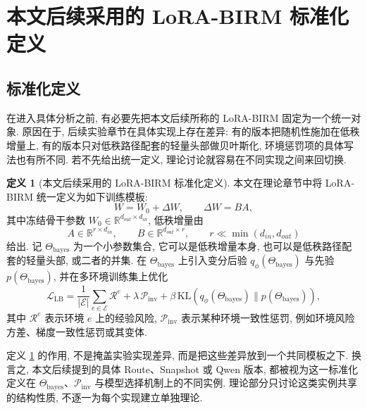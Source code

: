 \documentclass[a4paper,punct=banjiao,twoside]{ctexrep}
\theoremstyle{plain}
\theoremstyle{definition}
\newtheorem{defn}[thm]{定义}
\theoremstyle{remark}
\begin{document}
\section{本文后续采用的 LoRA-BIRM 标准化定义}

\subsection{标准化定义}

在进入具体分析之前, 有必要先把本文后续所称的 LoRA-BIRM 固定为一个统一对象. 原因在于, 后续实验章节在具体实现上存在差异: 有的版本把随机性施加在低秩增量上, 有的版本只对低秩路径配套的轻量头部做贝叶斯化, 环境惩罚项的具体写法也有所不同. 若不先给出统一定义, 理论讨论就容易在不同实现之间来回切换.

\begin{defn}[本文后续采用的 LoRA-BIRM 标准化定义]
\label{def:canonical_lora_birm}
本文在理论章节中将 LoRA-BIRM 统一定义为如下训练模板:
\begin{equation}
    W = W_0 + \Delta W, \qquad \Delta W = BA,
\end{equation}
其中冻结骨干参数 $W_0 \in \mathbb{R}^{d_{out}\times d_{in}}$, 低秩增量由
\begin{equation}
    A \in \mathbb{R}^{r\times d_{in}}, \qquad B \in \mathbb{R}^{d_{out}\times r}, \qquad r \ll \min(d_{in}, d_{out})
\end{equation}
给出. 记 $\Theta_{\text{bayes}}$ 为一个小参数集合, 它可以是低秩增量本身, 也可以是低秩路径配套的轻量头部, 或二者的并集. 在 $\Theta_{\text{bayes}}$ 上引入变分后验 $q_\phi(\Theta_{\text{bayes}})$ 与先验 $p(\Theta_{\text{bayes}})$, 并在多环境训练集上优化
\begin{equation}
    \mathcal{L}_{\text{LB}} =
    \frac{1}{|\mathcal{E}|}\sum_{e \in \mathcal{E}} \mathcal{R}^{e}
    + \lambda \, \mathcal{P}_{\text{inv}}
    + \beta \, \mathrm{KL}\!\left(q_\phi(\Theta_{\text{bayes}})\|p(\Theta_{\text{bayes}})\right),
\end{equation}
其中 $\mathcal{R}^{e}$ 表示环境 $e$ 上的经验风险, $\mathcal{P}_{\text{inv}}$ 表示某种环境一致性惩罚, 例如环境风险方差、梯度一致性惩罚或其变体.
\end{defn}

定义 \ref{def:canonical_lora_birm} 的作用, 不是掩盖实验实现差异, 而是把这些差异放到一个共同模板之下. 换言之, 本文后续提到的具体 Route、Snapshot 或 Qwen 版本, 都被视为这一标准化定义在 $\Theta_{\text{bayes}}$、$\mathcal{P}_{\text{inv}}$ 与模型选择机制上的不同实例. 理论部分只讨论这类实例共享的结构性质, 不逐一为每个实现建立单独理论.
\end{document}

